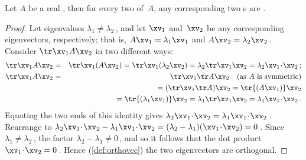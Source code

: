 \begin{theorem} \label{thm:orthoevec} 
Let \(A\) be a real , then for every two  of~\(A\), any corresponding two s are .
\end{theorem}
\begin{proof} 
Let eigenvalues \(\lambda_1\neq\lambda_2\)\,, and let \(\xv_1\) and~\(\xv_2\) be any corresponding eigenvectors, respectively; that is, \(A\xv_1=\lambda_1\xv_1\) and \(A\xv_2=\lambda_2\xv_2\)\,.
Consider \(\tr\xv_1A\xv_2\) in two different ways:
\begin{eqnarray*}
\tr\xv_1A\xv_2
&=&\tr\xv_1(A\xv_2)
=\tr\xv_1(\lambda_2\xv_2)
=\lambda_2\tr\xv_1\xv_2
=\lambda_2\xv_1\cdot\xv_2\,;
\\\tr\xv_1A\xv_2&=&\tr\xv_1\tr A\xv_2\quad\text{(as \(A\) is symmetric)}
\\&&{}=(\tr\xv_1\tr A)\xv_2
=\tr{(A\xv_1)}\xv_2
\\&&{}=\tr{(\lambda_1\xv_1)}\xv_2
=\lambda_1\tr\xv_1\xv_2
=\lambda_1\xv_1\cdot\xv_2\,.
\end{eqnarray*}
Equating the two ends of this identity gives \(\lambda_2\xv_1\cdot\xv_2=\lambda_1\xv_1\cdot\xv_2\)\,.
Rearrange to \(\lambda_2\xv_1\cdot\xv_2-\lambda_1\xv_1\cdot\xv_2
=(\lambda_2-\lambda_1)(\xv_1\cdot\xv_2)=0\)\,.
Since \(\lambda_1\neq\lambda_2\)\,, the factor \(\lambda_2-\lambda_1\neq0\)\,, and so it follows that the dot product \(\xv_1\cdot\xv_2=0\)\,.
Hence (\autoref{def:orthovec}) the two eigenvectors are orthogonal.
\end{proof}



